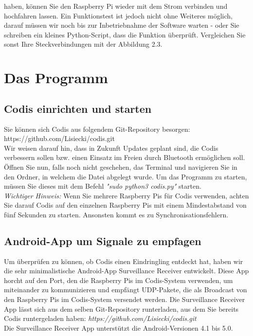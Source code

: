 \documentclass[12pt,a4paper]{scrreprt}
\begin{document}
haben, können Sie den Raspberry Pi wieder mit dem Strom verbinden und hochfahren lassen. Ein Funktionstest ist jedoch nicht ohne Weiteres möglich, darauf müssen wir noch bis zur Inbetriebnahme der Software warten - oder Sie schreiben ein kleines Python-Script, dass die Funktion überprüft. Vergleichen Sie sonst Ihre Steckverbindungen mit der Abbildung 2.3.

\chapter{Das Programm}
\section{Codis einrichten und starten}
Sie können sich Codis aus folgendem Git-Repository besorgen: https://github.com/Lisiecki/codis.git
\\
Wir weisen darauf hin, dass in Zukunft Updates geplant sind, die Codis verbessern sollen bzw. einen Einsatz im Freien durch Bluetooth ermöglichen soll. Öffnen Sie nun, falls noch nicht geschehen, das Terminal und navigieren Sie in den Ordner, in welchem die Datei abgelegt wurde. Um das Programm zu starten, müssen Sie dieses mit dem Befehl \textit{"sudo python3 codis.py"} starten.\\ \textit{Wichtiger Hinweis:} Wenn Sie mehrere Raspberry Pis für Codis verwenden, achten Sie darauf Codis auf den einzelnen Raspberry Pis mit einem Mindestabstand von fünf Sekunden zu starten. Ansonsten kommt es zu Synchronisationsfehlern.\\

\section{Android-App um Signale zu empfagen}

Um überprüfen zu können, ob Codis einen Eindringling entdeckt hat, haben wir die sehr minimalistische Android-App Surveillance Receiver entwickelt. Diese App horcht auf den Port, den die Raspberry Pis im Codis-System verwenden, um miteinander zu kommunizieren und empfängt UDP-Pakete, die als Broadcast von den Raspberry Pis im Codis-System versendet werden. Die Surveillance Receiver App lässt sich aus dem selben Git-Repository runterladen, aus dem Sie bereits Codis runtergeladen haben: \textit{https://github.com/Lisiecki/codis.git}\\
Die Surveillance Receiver App unterstützt die Android-Versionen 4.1 bis 5.0.
\end{document}
